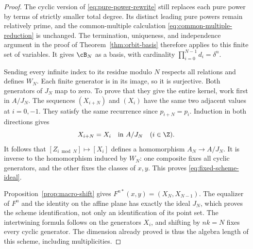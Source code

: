 \begin{proof}
The cyclic version of \eqref{eq:pure-power-rewrite} still replaces
each pure power by terms of strictly smaller total degree.  Its distinct
leading pure powers remain relatively prime, and the common-multiple
calculation \eqref{eq:common-multiple-reduction} is unchanged.
The termination, uniqueness, and independence argument in the proof of
Theorem~\ref{thm:orbit-basis} therefore applies to this finite set of
variables.  It gives $\cB_N$ as a basis, with cardinality
$\prod_{i=0}^{N-1}d_i=\delta^n$.

Sending every infinite index to its residue modulo $N$ respects all
relations and defines $W_N$.  Each finite generator is in its image,
so it is surjective.  Both generators of $J_N$ map to zero.
To prove that they give the entire kernel, work first in $A/J_N$.
The sequences $(X_{i+N})$ and $(X_i)$ have the same two adjacent
values at $i=0,-1$.  They satisfy the same recurrence since
$p_{i+N}=p_i$.  Induction in both directions gives
\[
  X_{i+N}=X_i\quad\text{in }A/J_N\quad(i\in\Z).
\]
It follows that $[Z_{i\bmod N}]\mapsto[X_i]$ defines a homomorphism
$A_N\to A/J_N$.  It is inverse to the homomorphism induced by
$W_N$: one composite fixes all cyclic generators, and the other fixes
the classes of $x,y$.  This proves \eqref{eq:fixed-scheme-ideal}.

Proposition~\ref{prop:macro-shift} gives
$F^{n*}(x,y)=(X_N,X_{N-1})$.  The equalizer of $F^n$ and the identity
on the affine plane has exactly the ideal $J_N$, which proves the
scheme identification, not only an identification of its point set.
The intertwining formula follows on the generators $X_i$, and shifting
by $nk=N$ fixes every cyclic generator.  The dimension already proved
is thus the algebra length of this scheme, including multiplicities.
\end{proof}
